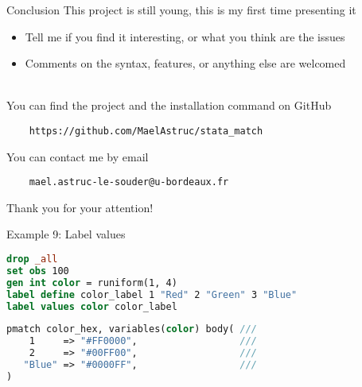 \documentclass[11pt]{beamer}
\begin{document}
\begin{frame}[fragile]{Conclusion}
This project is still young, this is my first time presenting it
\begin{itemize}
    \item Tell me if you find it interesting, or what you think are the issues
    \item Comments on the syntax, features, or anything else are welcomed \\~
\end{itemize}

You can find the project and the installation command on GitHub
\begin{verbatim}
    https://github.com/MaelAstruc/stata_match
\end{verbatim}

You can contact me by email
\begin{verbatim}
    mael.astruc-le-souder@u-bordeaux.fr

\end{verbatim}

\begin{center}
Thank you for your attention!
\end{center}

\end{frame}

\begin{frame}{Example 9: Label values}
\label{example_9}

\footnotesize
\begin{lstlisting}[language=Stata]
drop _all
set obs 100
gen int color = runiform(1, 4)
label define color_label 1 "Red" 2 "Green" 3 "Blue"
label values color color_label 
\end{lstlisting}

\begin{lstlisting}[language=Stata]
pmatch color_hex, variables(color) body( ///
    1     => "#FF0000",                  ///
    2     => "#00FF00",                  ///
   "Blue" => "#0000FF",                  ///
)
\end{lstlisting}

\end{frame}
\end{document}
